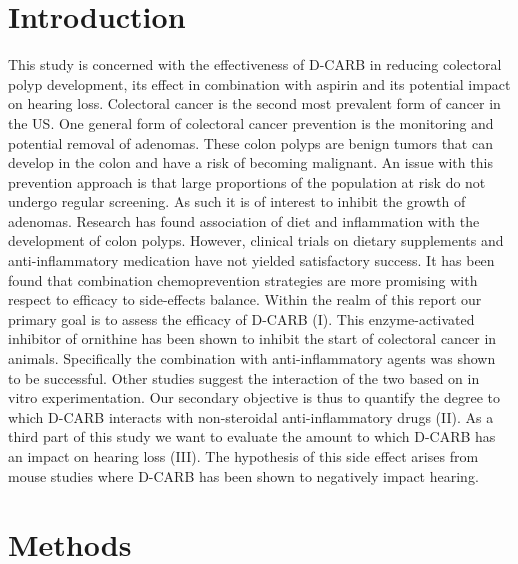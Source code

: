 \documentclass[paper=a4, fontsize=11pt]{scrartcl} %
\numberwithin{equation}{section} %
\numberwithin{figure}{section} %
\numberwithin{table}{section} %
\begin{document}
\section{Introduction}
This study is concerned with the effectiveness of D-CARB in reducing colectoral polyp development, its effect in combination with aspirin and its potential impact on hearing loss. Colectoral cancer is the second most prevalent form of cancer in the US. One general form of colectoral cancer prevention is the monitoring and potential removal of adenomas. These colon polyps are benign tumors that can develop in the colon and have a risk of becoming malignant. An issue with this prevention approach is that large proportions of the population at risk do not undergo regular screening. As such it is of interest to inhibit the growth of adenomas. Research has found association of diet and inflammation with the development of colon polyps. However, clinical trials on dietary supplements and anti-inflammatory medication have not yielded satisfactory success. It has been found that combination chemoprevention strategies are more promising with respect to efficacy to side-effects balance. Within the realm of this report our primary goal is to assess the efficacy of D-CARB (I). This enzyme-activated inhibitor of ornithine has been shown to inhibit the start of colectoral cancer in animals. Specifically the combination with anti-inflammatory agents was shown to be successful. Other studies suggest the interaction of the two based on in vitro experimentation. Our secondary objective is thus to quantify the degree to which D-CARB interacts with non-steroidal anti-inflammatory drugs (II). As a third part of this study we want to evaluate the amount to which D-CARB has an impact on hearing loss (III). The hypothesis of this side effect arises from mouse studies where D-CARB has been shown to negatively impact hearing.

\section{Methods}
\end{document}
